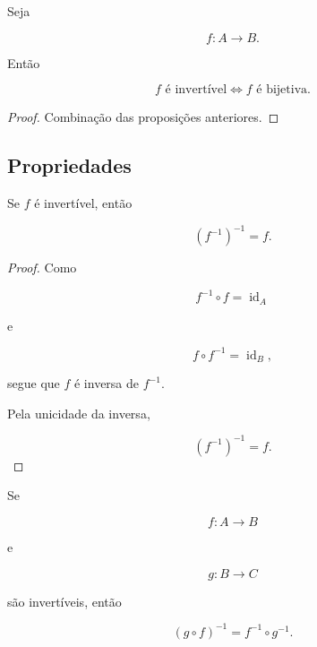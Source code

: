 \documentclass[../../main]{subfiles}
\begin{document}
\begin{thm}
	\label{thm:matematica:funcoes:funcoes-inversas:caracterizacao}

	Seja

	\[
		f:A\to B.
	\]

	Então

	\[
		f
		\text{ é invertível}
		\iff
		f
		\text{ é bijetiva}.
	\]

\end{thm}

\begin{proof}

	Combinação das proposições anteriores.

\end{proof}

\subsection{Propriedades}

\begin{prop}
	\label{prop:matematica:funcoes:funcoes-inversas:inversa-da-inversa}

	Se \(f\) é invertível, então

	\[
		(f^{-1})^{-1}
		=
		f.
	\]

\end{prop}

\begin{proof}

	Como

	\[
		f^{-1}\circ f
		=
		\operatorname{id}_A
	\]

	e

	\[
		f\circ f^{-1}
		=
		\operatorname{id}_B,
	\]

	segue que \(f\) é inversa de \(f^{-1}\).

	Pela unicidade da inversa,

	\[
		(f^{-1})^{-1}
		=
		f.
	\]

\end{proof}

\begin{prop}
	\label{prop:matematica:funcoes:funcoes-inversas:inversa-composicao}

	Se

	\[
		f:A\to B
	\]

	e

	\[
		g:B\to C
	\]

	são invertíveis, então

	\[
		(g\circ f)^{-1}
		=
		f^{-1}\circ g^{-1}.
	\]

\end{prop}
\end{document}
